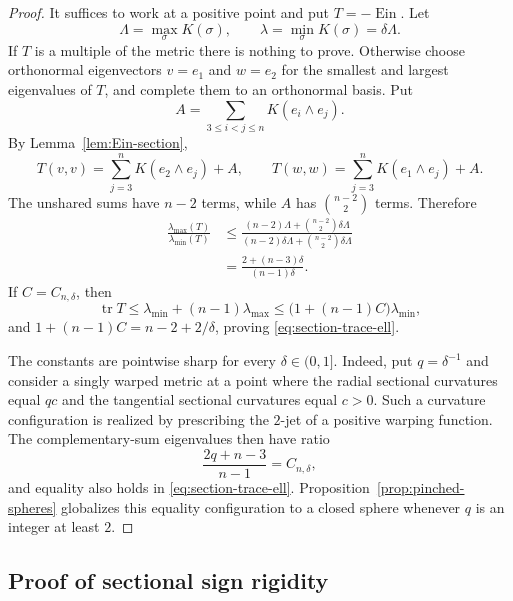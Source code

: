 \documentclass[11pt,reqno]{amsart}
\theoremstyle{definition}
\theoremstyle{remark}
\newcommand{\Ein}{\operatorname{Ein}}
\newcommand{\tr}{\operatorname{tr}}
\begin{document}
\begin{proof}
It suffices to work at a positive point and put $T=-\Ein$.  Let
\[
\Lambda=\max_\sigma K(\sigma),
\qquad
\lambda=\min_\sigma K(\sigma)=\delta\Lambda.
\]
If $T$ is a multiple of the metric there is nothing to prove.  Otherwise choose orthonormal eigenvectors $v=e_1$ and $w=e_2$ for the smallest and largest eigenvalues of $T$, and complete them to an orthonormal basis.  Put
\[
A=\sum_{3\le i<j\le n}K(e_i\wedge e_j).
\]
By Lemma~\ref{lem:Ein-section},
\[
T(v,v)=\sum_{j=3}^nK(e_2\wedge e_j)+A,
\qquad
T(w,w)=\sum_{j=3}^nK(e_1\wedge e_j)+A.
\]
The unshared sums have $n-2$ terms, while $A$ has $\binom{n-2}{2}$ terms.  Therefore
\begin{align*}
\frac{\lambda_{\max}(T)}{\lambda_{\min}(T)}
&\le
\frac{(n-2)\Lambda+\binom{n-2}{2}\delta\Lambda}
{(n-2)\delta\Lambda+\binom{n-2}{2}\delta\Lambda}\\
&=\frac{2+(n-3)\delta}{(n-1)\delta}.
\end{align*}
If $C=C_{n,\delta}$, then
\[
\tr T\le\lambda_{\min}+(n-1)\lambda_{\max}
\le\bigl(1+(n-1)C\bigr)\lambda_{\min},
\]
and $1+(n-1)C=n-2+2/\delta$, proving \eqref{eq:section-trace-ell}.

The constants are pointwise sharp for every $\delta\in(0,1]$.  Indeed, put $q=\delta^{-1}$ and consider a singly warped metric at a point where the radial sectional curvatures equal $qc$ and the tangential sectional curvatures equal $c>0$.  Such a curvature configuration is realized by prescribing the $2$-jet of a positive warping function.  The complementary-sum eigenvalues then have ratio
\[
\frac{2q+n-3}{n-1}=C_{n,\delta},
\]
and equality also holds in \eqref{eq:section-trace-ell}.  Proposition~\ref{prop:pinched-spheres} globalizes this equality configuration to a closed sphere whenever $q$ is an integer at least $2$.
\end{proof}

\subsection{Proof of sectional sign rigidity}
\end{document}
